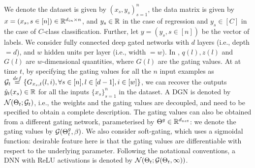 We denote the dataset is given by $(x_s,y_s)_{s=1}^n$, the data matrix is given by $x=(x_s,s\in[n])\in\mathbb{R}^{d_{in}\times n}$, and $y_s\in\mathbb{R}$ in the case of regression and $y_s\in[C]$ in the case of $C$-class classification. Further, let $y=(y_s,s\in[n])$ be the vector of labels. We consider fully connected deep gated networks with $d$ layers (i.e., depth $=d$), and $w$ hidden units per layer (i.e., width $=w$). In , $q(l),z(l)$ and $G(l)$ are $w$-dimensional quantities, where $G(l)$ are the gating values.  At at time $t$, by specifying the gating values for all the $n$ input examples as $\mathcal{G}_t\stackrel{def}=\{G_{x_{s},t}(l,i), \forall s\in[n],l\in[d-1],i\in[w]\}$, we can recover the outputs $\hat{y}_t(x_s)\in \mathbb{R}$ for all the inputs $\{x_s\}_{s=1}^n$ in the dataset.  A DGN is denoted by $\mathcal{N}(\Theta_t;\mathcal{G}_t)$, i.e., the weights and the gating values are decoupled, and need to be specified to obtain a complete description. The gating values can also be obtained from a different gating network, parameterised by ${\Theta}^g\in\mathbb{R}^{d_{net}}$: we denote the gating values by $\mathcal{G}({\Theta}^g_t,\beta)$. We also consider soft-gating, which uses a sigmoidal function: desirable feature here is that the gating values are differentiable with respect to the underlying parameter. Following the notational conventions, a DNN with ReLU activations is denoted by $\mathcal{N}(\Theta_t;\mathcal{G}(\Theta_t,\infty))$.\begin{comment}
The DGN framework allows us the flexibility to study a host of deep networks with different gating mechanisms. The gates can be fixed (i.e., $\G_t=\G_0,\forall t\geq 0$) or learnable, i.e., $\G_t$ changes during training. The gates can be parameterised explicitly with $\Tg\neq \Theta$, or implicitly with $\Tg=\Theta$, or unparameterised. Further, the gating can be hard taking values in $\{0,1\}$ or soft taking values in $(0,1+\epsilon)$.
\end{comment}

